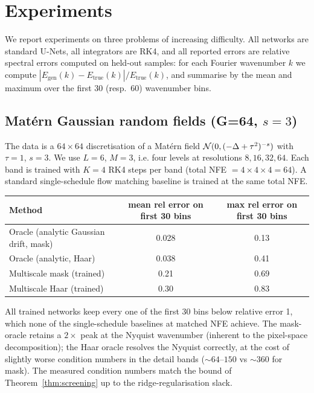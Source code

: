 \documentclass[11pt]{amsart}
\theoremstyle{remark}
\numberwithin{equation}{section}
\begin{document}
\section{Experiments}
\label{sec:experiments}
We report experiments on three problems of increasing difficulty. All networks are standard U-Nets, all integrators are RK4, and all reported errors are relative spectral errors computed on held-out samples: for each Fourier wavenumber $k$ we compute $|E_{\mathrm{gen}}(k)-E_{\mathrm{true}}(k)|/E_{\mathrm{true}}(k)$, and summarise by the mean and maximum over the first 30 (resp.\ 60) wavenumber bins.

\subsection{Mat\'ern Gaussian random fields (G=64, $s=3$)}
The data is a $64\times 64$ discretisation of a Mat\'ern field $\mathcal{N}(0,(-\Delta+\tau^2)^{-s})$ with $\tau=1$, $s=3$. We use $L=6$, $M=3$, i.e. four levels at resolutions $8,16,32,64$. Each band is trained with $K=4$ RK4 steps per band (total NFE $=4\times 4\times 4=64$). A standard single-schedule flow matching baseline is trained at the same total NFE.

\begin{center}
\begin{tabular}{lcc}
\hline
Method & mean rel error on first 30 bins & max rel error on first 30 bins\\
\hline
Oracle (analytic Gaussian drift, mask) & 0.028 & 0.13\\
Oracle (analytic, Haar) & 0.038 & 0.41\\
Multiscale mask (trained) & 0.21 & 0.69\\
Multiscale Haar (trained) & 0.30 & 0.83\\
\hline
\end{tabular}
\end{center}
All trained networks keep every one of the first 30 bins below relative error 1, which none of the single-schedule baselines at matched NFE achieve. The mask-oracle retains a $2\times$ peak at the Nyquist wavenumber (inherent to the pixel-space decomposition); the Haar oracle resolves the Nyquist correctly, at the cost of slightly worse condition numbers in the detail bands ($\sim\!64$--$150$ vs $\sim\!360$ for mask). The measured condition numbers match the bound of Theorem~\ref{thm:screening} up to the ridge-regularisation slack.
\end{document}
